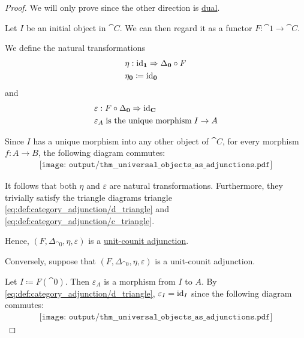 \begin{proof}
  We will only prove  since the other direction is \hyperref[thm:universal_objects_as_adjunctions/initial]{dual}.

  \SufficiencySubProof Let \( I \) be an initial object in \( \cat{C} \). We can then regard it as a functor \( F: \cat{1} \to \cat{C} \).

  We define the natural transformations
  \begin{equation*}
    \begin{aligned}
      &\eta: \id_{\cat{1}} \Rightarrow \Delta_{\cat{0}} \bincirc F \\
      &\eta_{\cat{0}} \coloneqq \id_{\cat{0}}
    \end{aligned}
  \end{equation*}
  and
  \begin{equation*}
    \begin{aligned}
      &\varepsilon: F \bincirc \Delta_{\cat{0}} \Rightarrow \id_{\cat{C}} \\
      &\varepsilon_A \T{is the unique morphism} I \to A
    \end{aligned}
  \end{equation*}

  Since \( I \) has a unique morphism into any other object of \( \cat{C} \), for every morphism \( f: A \to B \), the following diagram commutes:
  \begin{equation}\label{eq:thm:universal_objects_as_adjunctions/sufficiency_nat}
    \begin{aligned}
      \texttt{[image: output/thm\_\_universal\_objects\_as\_adjunctions.pdf]}
    \end{aligned}
  \end{equation}

  It follows that both \( \eta \) and \( \varepsilon \) are natural transformations. Furthermore, they trivially satisfy the triangle diagrams triangle \eqref{eq:def:category_adjunction/d_triangle} and \eqref{eq:def:category_adjunction/c_triangle}.

  Hence, \( (F, \Delta_{\cat{0}}, \eta, \varepsilon) \) is a \hyperref[def:category_adjunction/unit_counit]{unit-counit adjunction}.

  \NecessitySubProof Conversely, suppose that \( (F, \Delta_{\cat{0}}, \eta, \varepsilon) \) is a unit-counit adjunction.

  Let \( I \coloneqq F(\cat{0}) \). Then \( \varepsilon_A \) is a morphism from \( I \) to \( A \). By \eqref{eq:def:category_adjunction/d_triangle}, \( \varepsilon_I = \operatorname{id}_I \) since the following diagram commutes:
  \begin{equation}\label{eq:thm:universal_objects_as_adjunctions/d_triangle}
    \begin{aligned}
      \texttt{[image: output/thm\_\_universal\_objects\_as\_adjunctions.pdf]}
    \end{aligned}
  \end{equation}


\end{proof}
